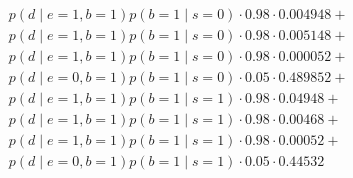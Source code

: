 \documentclass[12pt]{report}
\begin{document}
\begin{align*}
    &p(d\mid e=1,b=1)p(b=1\mid s=0) \cdot  0.98 \cdot 0.004948 + \\
    &p(d\mid e=1,b=1)p(b=1\mid s=0) \cdot  0.98 \cdot 0.005148 + \\
    &p(d\mid e=1,b=1)p(b=1\mid s=0) \cdot  0.98 \cdot 0.000052 + \\
    &p(d\mid e=0,b=1)p(b=1\mid s=0) \cdot  0.05 \cdot 0.489852 + \\
    &p(d\mid e=1,b=1)p(b=1\mid s=1) \cdot  0.98 \cdot 0.04948  + \\
    &p(d\mid e=1,b=1)p(b=1\mid s=1) \cdot  0.98 \cdot 0.00468  + \\
    &p(d\mid e=1,b=1)p(b=1\mid s=1) \cdot  0.98 \cdot 0.00052  + \\
    &p(d\mid e=0,b=1)p(b=1\mid s=1) \cdot  0.05 \cdot 0.44532
\end{align*}
\end{document}
